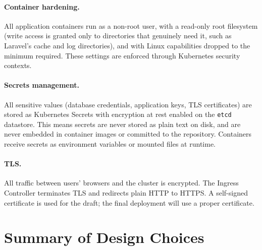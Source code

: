\documentclass[12pt,a4paper]{article}
\begin{document}
\paragraph{Container hardening.} All application containers run as a non-root user, with a read-only root filesystem (write access is granted only to directories that genuinely need it, such as Laravel's cache and log directories), and with Linux capabilities dropped to the minimum required. These settings are enforced through Kubernetes security contexts.

\paragraph{Secrets management.} All sensitive values (database credentials, application keys, TLS certificates) are stored as Kubernetes Secrets with encryption at rest enabled on the \texttt{etcd} datastore. This means secrets are never stored as plain text on disk, and are never embedded in container images or committed to the repository. Containers receive secrets as environment variables or mounted files at runtime.

\paragraph{TLS.} All traffic between users' browsers and the cluster is encrypted. The Ingress Controller terminates TLS and redirects plain HTTP to HTTPS. A self-signed certificate is used for the draft; the final deployment will use a proper certificate.

\section{Summary of Design Choices}
\end{document}
